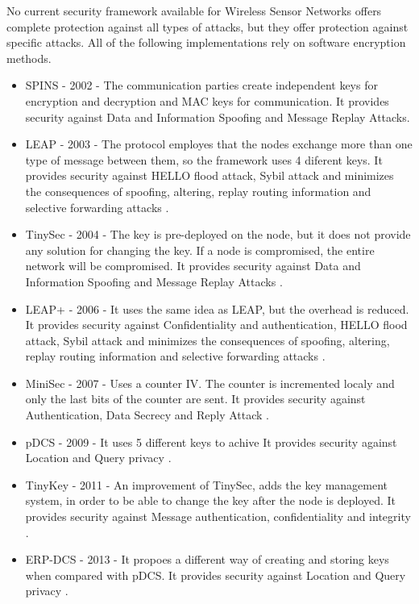 No current security framework available for Wireless Sensor Networks offers complete protection
against all types of attacks, but they offer protection against specific attacks. All of the following implementations rely on 
software encryption methods.
\begin{itemize}

\item SPINS - 2002 - The communication parties create independent keys for encryption and decryption
and MAC keys for communication. It provides security against Data and Information Spoofing and Message Replay Attacks\cite{perrig2002spins}.

\item LEAP - 2003 - The protocol employes that the nodes exchange more than one type of message between them, so the framework uses 4 diferent keys. It provides security against HELLO flood attack, Sybil attack and minimizes the consequences of spoofing, altering, replay routing information and selective forwarding attacks \cite{zhu2006leap+}.

\item TinySec - 2004 - The key is pre-deployed on the node, but it does not provide any solution for changing the key. If a node is compromised, the entire network will be compromised. It provides security against Data and Information Spoofing and Message Replay Attacks \cite{karlof2004tinysec}.

\item LEAP+ - 2006 - It uses the same idea as LEAP, but the overhead is reduced. It provides security against Confidentiality and authentication, HELLO flood attack, Sybil attack and minimizes the consequences of spoofing, altering, replay routing information and selective forwarding attacks \cite{zhu2006leap+}.
 
\item MiniSec - 2007 - Uses a counter IV. The counter is incremented localy and only the last bits of the counter are sent. It provides security against Authentication, Data Secrecy and Reply Attack \cite{luk2007minisec}.

\item pDCS - 2009 - It uses 5 different keys to achive  It provides security against Location and Query privacy \cite{shao2009pdcs}.

\item TinyKey - 2011 - An improvement of TinySec, adds the key management system, in order to be able to change the key after the node is deployed. It provides security against Message authentication, confidentiality and integrity \cite{doriguzzi2011tinykey}.

\item ERP-DCS - 2013 - It propoes a different way of creating and storing keys when compared with pDCS. It provides security against Location and Query privacy \cite{huang2013efficient}.

\end{itemize}
